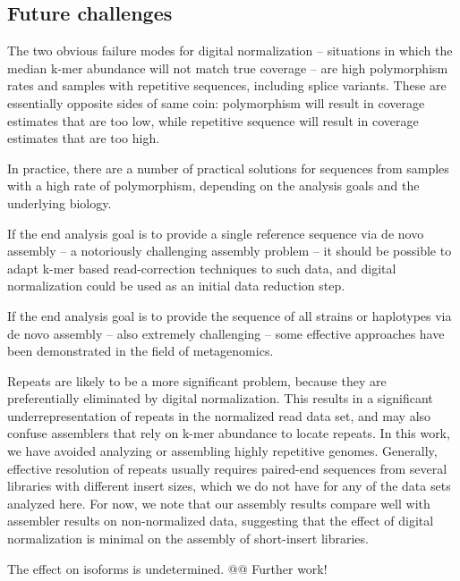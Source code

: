 \documentclass[10pt,draft]{article}
\begin{document}

\subsection*{Future challenges}

The two obvious failure modes for digital normalization -- situations
in which the median k-mer abundance will not match true coverage --
are high polymorphism rates and samples with repetitive sequences,
including splice variants.  These are essentially opposite sides of
same coin: polymorphism will result in coverage estimates that are too
low, while repetitive sequence will result in coverage estimates that
are too high.

In practice, there are a number of practical solutions for sequences
from samples with a high rate of polymorphism, depending on the
analysis goals and the underlying biology.

If the end analysis goal is to provide a single reference sequence via
de novo assembly -- a notoriously challenging assembly problem -- it
should be possible to adapt k-mer based read-correction techniques to
such data, and digital normalization could be used as an initial data
reduction step.

If the end analysis goal is to provide the sequence of all strains or
haplotypes via de novo assembly -- also extremely challenging -- some
effective approaches have been demonstrated in the field of
metagenomics.

Repeats are likely to be a more significant problem, because they are
preferentially eliminated by digital normalization.  This results in a
significant underrepresentation of repeats in the normalized read data
set, and may also confuse assemblers that rely on k-mer abundance to
locate repeats.  In this work, we have avoided analyzing or assembling
highly repetitive genomes.  Generally, effective resolution of repeats
usually requires paired-end sequences from several libraries with
different insert sizes, which we do not have for any of the data sets
analyzed here.  For now, we note that our assembly results compare
well with assembler results on non-normalized data, suggesting that
the effect of digital normalization is minimal on the assembly of
short-insert libraries.

The effect on isoforms is undetermined.  @@  Further work!
\end{document}
